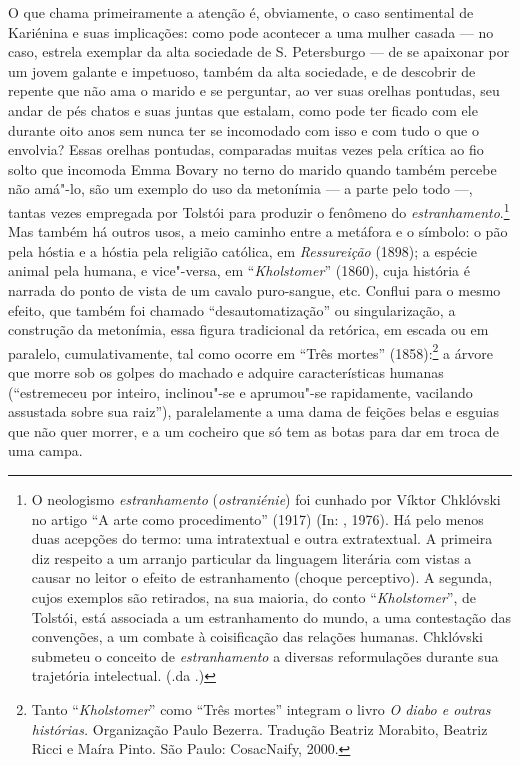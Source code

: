 O que chama primeiramente a atenção é, obviamente, o caso sentimental de
Kariénina e suas implicações: como pode acontecer a uma mulher
casada --- no caso, estrela exemplar da alta sociedade de S.
Petersburgo --- de se apaixonar por um jovem galante e impetuoso, também
da alta sociedade, e de descobrir de repente que não ama o marido e se
perguntar, ao ver suas orelhas pontudas, seu andar de pés chatos e suas
juntas que estalam, como pode ter ficado com ele durante oito anos sem
nunca ter se incomodado com isso e com tudo o que o envolvia? Essas orelhas
pontudas, comparadas muitas vezes pela crítica ao fio solto que incomoda
Emma Bovary no terno do marido quando também percebe não amá"-lo, são um
exemplo do uso da metonímia --- a parte pelo todo ---, tantas
vezes empregada por Tolstói para produzir o fenômeno do \emph{estranhamento}.\footnote{O neologismo \emph{estranhamento} (\emph{ostraniénie}) foi cunhado por Víktor Chklóvski no artigo “A arte como procedimento” (1917) (In: , 1976). Há pelo menos duas acepções do termo: uma intratextual e outra extratextual.
A primeira diz respeito a um arranjo particular da linguagem literária com vistas a causar no leitor o efeito de estranhamento (choque perceptivo). A segunda, cujos exemplos são retirados, na sua maioria, do conto ``\emph{Kholstomer}'', de
Tolstói, está associada a um estranhamento do mundo, a uma contestação das convenções, a um combate à coisificação das relações humanas. Chklóvski submeteu o conceito de \emph{estranhamento} a diversas reformulações durante sua trajetória intelectual. (.da .)}
Mas também há outros usos, a meio caminho entre a metáfora e o símbolo:
o pão pela hóstia e a hóstia pela religião católica,
em \emph{Ressureição} (1898); a espécie animal pela
humana, e vice"-versa, em ``\emph{Kholstomer}'' (1860),
cuja história é narrada do ponto de vista de um cavalo puro-sangue, etc. Conflui para o
mesmo efeito, que também foi chamado ``desautomatização'' ou
singularização, a construção da metonímia, essa figura tradicional da
retórica, em escada ou em paralelo, cumulativamente, tal como
ocorre em ``Três mortes'' (1858):\footnote{Tanto ``\emph{Kholstomer}'' como ``Três mortes'' integram o livro
\emph{O diabo e outras histórias.} Organização Paulo Bezerra. Tradução Beatriz
Morabito, Beatriz Ricci e Maíra Pinto. São Paulo: CosacNaify, 2000.} a árvore que morre sob os golpes
do machado e adquire características humanas (``estremeceu por
inteiro, inclinou"-se e aprumou"-se rapidamente, vacilando assustada sobre
sua raiz''), paralelamente a uma dama de feições belas e esguias que
não quer morrer, e a um cocheiro que só tem as botas para dar em troca
de uma campa.

